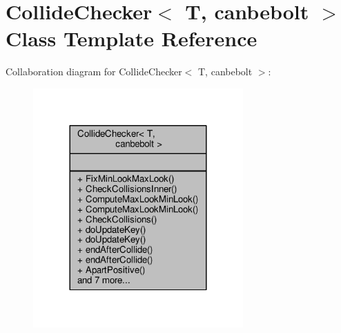 \hypertarget{classCollideChecker}{}\section{Collide\+Checker$<$ T, canbebolt $>$ Class Template Reference}
\label{classCollideChecker}


Collaboration diagram for Collide\+Checker$<$ T, canbebolt $>$\+:
\nopagebreak
\begin{figure}[H]
\begin{center}
\leavevmode
\includegraphics[width=228pt]{df/daa/classCollideChecker__coll__graph}
\end{center}
\end{figure}
